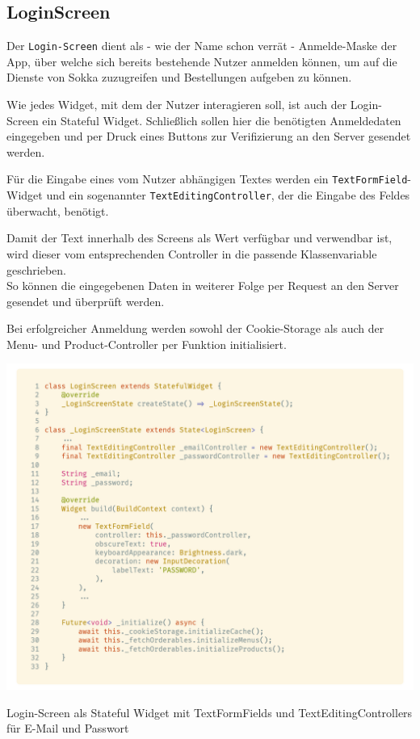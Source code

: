 \subsection{LoginScreen}

Der \lstinline{Login-Screen} dient als - wie der Name schon verrät - Anmelde-Maske der App, über 
welche sich bereits bestehende Nutzer anmelden können, um auf die Dienste von Sokka zuzugreifen und
Bestellungen aufgeben zu können.

Wie jedes Widget, mit dem der Nutzer interagieren soll, ist auch der Login-Screen ein Stateful 
Widget. Schließlich sollen hier die benötigten Anmeldedaten eingegeben und per Druck eines Buttons
zur Verifizierung an den Server gesendet werden.

Für die Eingabe eines vom Nutzer abhängigen Textes werden ein \lstinline{TextFormField}-Widget
und ein sogenannter \lstinline{TextEditingController}, der die Eingabe des Feldes überwacht,
benötigt.

Damit der Text innerhalb des Screens als Wert verfügbar und verwendbar ist, wird dieser vom entsprechenden
Controller in die passende Klassenvariable geschrieben.\\
So können die eingegebenen Daten in weiterer Folge per Request an den Server gesendet und überprüft werden.

\newpage

Bei erfolgreicher Anmeldung werden sowohl der Cookie-Storage als auch der Menu- und
Product-Controller per Funktion initialisiert.

\begin{code}[H]
    \centering
    \includegraphics[width=1\textwidth]{images/Client/screens/login/loginScreen.png}
    \caption{Login-Screen als Stateful Widget mit TextFormFields und TextEditingControllers für E-Mail und Passwort}
\end{code}

\newpage